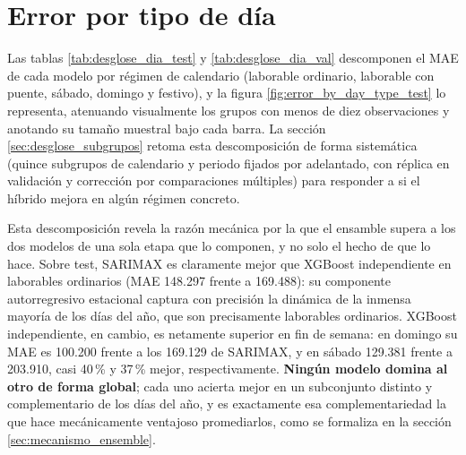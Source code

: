 \section{Error por tipo de día}\label{sec:error_dia}

Las tablas \ref{tab:desglose_dia_test} y \ref{tab:desglose_dia_val} descomponen el MAE de
cada modelo por régimen de calendario (laborable ordinario, laborable con puente, sábado,
domingo y festivo), y la figura \ref{fig:error_by_day_type_test} lo representa, atenuando
visualmente los grupos con menos de diez observaciones y anotando su tamaño muestral bajo
cada barra. La sección \ref{sec:desglose_subgrupos} retoma esta descomposición de forma
sistemática (quince subgrupos de calendario y periodo fijados por adelantado, con réplica
en validación y corrección por comparaciones múltiples) para responder a si el híbrido
mejora en algún régimen concreto.

\begin{table}[htbp]
  \centering
  \small
  
  \caption{}
  \label{tab:desglose_dia_test}
\end{table}

\begin{table}[htbp]
  \centering
  \small
  
  \caption{}
  \label{tab:desglose_dia_val}
\end{table}

Esta descomposición revela la razón mecánica por la que el ensamble supera a los dos
modelos de una sola etapa que lo componen, y no solo el hecho de que lo hace. Sobre test,
SARIMAX es claramente mejor que XGBoost independiente en laborables ordinarios (MAE
148.297 frente a 169.488): su componente autorregresivo estacional captura con precisión
la dinámica de la inmensa mayoría de los días del año, que son precisamente laborables
ordinarios. XGBoost independiente, en cambio, es netamente superior en fin de semana: en
domingo su MAE es 100.200 frente a los 169.129 de SARIMAX, y en sábado 129.381 frente a
203.910, casi 40\,\% y 37\,\% mejor, respectivamente. \textbf{Ningún modelo domina al otro de forma global}; cada uno acierta mejor en
un subconjunto distinto y complementario de los días del año, y es exactamente esa
complementariedad la que hace mecánicamente ventajoso promediarlos, como se formaliza en
la sección \ref{sec:mecanismo_ensemble}.

